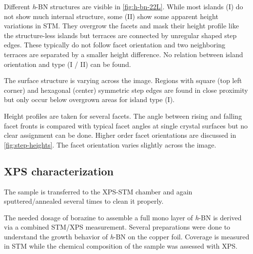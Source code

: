 Different \textit{h}-BN structures are visible in \autoref{fig:h-bn-22L}. While most islands (I) do not show much internal structure, some (II) show some apparent height variations in STM. They overgrow the facets and mask their height profile like the structure-less islands but terraces are connected by unregular shaped step edges. These typically do not follow facet orientation and two neighboring terraces are separated by a smaller height difference.  No relation between island orientation and type (I / II) can be found.

The surface structure is varying across the image. Regions with square (top left corner) and hexagonal (center) symmetric step edges are found in close proximity but only occur below overgrown areas for island type (I). 

Height profiles are taken for several facets. The angle between rising and falling facet fronts is compared with typical facet angles at single crystal surfaces but no clear assignment can be done. Higher order facet orientations are discussed in \autoref{fig:step-heights}. The facet orientation varies slightly across the image. 

\FloatBarrier

\subsection{XPS characterization}
The sample is transferred to the XPS-STM chamber and again sputtered/annealed several times to clean it properly.

The needed dosage of borazine to assemble a full mono layer of \textit{h}-BN is derived via a combined STM/XPS measurement. Several preparations were done to understand the growth behavior of \textit{h}-BN on the copper foil. Coverage is measured in STM while the chemical composition of the sample was assessed with XPS.

